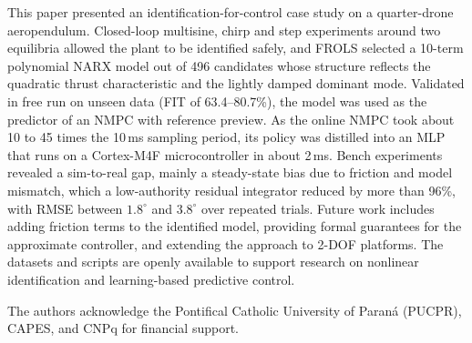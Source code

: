 \documentclass{ifacconf}
\newif\ifinstr \instrfalse
\newcommand{\tamanho}[1]{%
  \ifinstr
    \par\noindent
    \fcolorbox{blue!80!black}{gray!20}{%
      \parbox{\dimexpr\linewidth-2\fboxsep-2\fboxrule}{%
        \small\sffamily\color{black!40!black}%
        \textbf{Tamanho:} #1}}%
    \par\medskip
  \fi}
\begin{document}
\tamanho{1 p. (contando as referências)}

This paper presented an identification-for-control case study on a quarter-drone aeropendulum. Closed-loop multisine, chirp and step experiments around two equilibria allowed the plant to be identified safely, and FROLS selected a 10-term polynomial NARX model out of 496 candidates whose structure reflects the quadratic thrust characteristic and the lightly damped dominant mode. Validated in free run on unseen data (FIT of 63.4--80.7\%), the model was used as the predictor of an NMPC with reference preview. As the online NMPC took about 10 to 45 times the 10\,ms sampling period, its policy was distilled into an MLP that runs on a Cortex-M4F microcontroller in about 2\,ms. Bench experiments revealed a sim-to-real gap, mainly a steady-state bias due to friction and model mismatch, which a low-authority residual integrator reduced by more than 96\%, with RMSE between $1.8^\circ$ and $3.8^\circ$ over repeated trials. Future work includes adding friction terms to the identified model, providing formal guarantees for the approximate controller, and extending the approach to 2-DOF platforms. The datasets and scripts are openly available to support research on nonlinear identification and learning-based predictive control.

\begin{ack}
The authors acknowledge the Pontifical Catholic University of Paraná (PUCPR), CAPES, and CNPq for financial support.
\end{ack}

      
\end{document}
